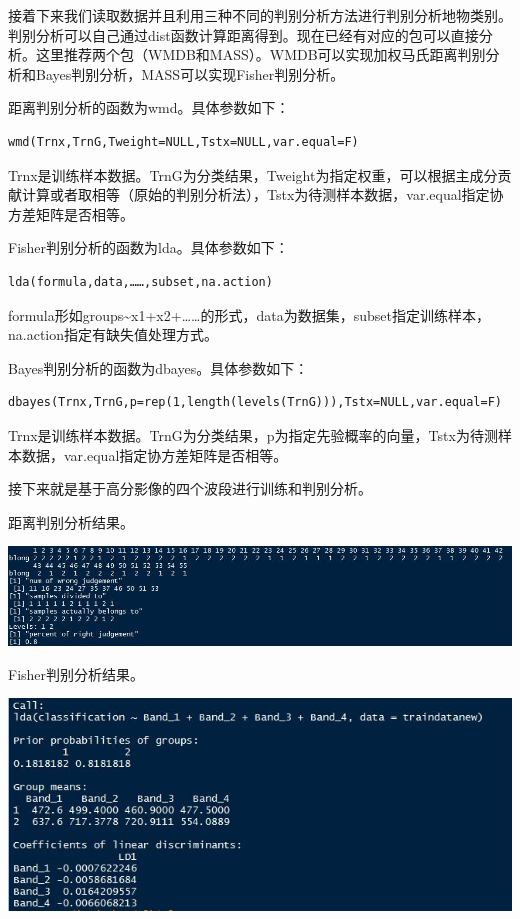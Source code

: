 \documentclass[]{ctexbook}
\begin{document}
接着下来我们读取数据并且利用三种不同的判别分析方法进行判别分析地物类别。判别分析可以自己通过dist函数计算距离得到。现在已经有对应的包可以直接分析。这里推荐两个包（WMDB和MASS）。WMDB可以实现加权马氏距离判别分析和Bayes判别分析，MASS可以实现Fisher判别分析。

距离判别分析的函数为wmd。具体参数如下：

\begin{verbatim}
wmd(Trnx,TrnG,Tweight=NULL,Tstx=NULL,var.equal=F)
\end{verbatim}

Trnx是训练样本数据。TrnG为分类结果，Tweight为指定权重，可以根据主成分贡献计算或者取相等（原始的判别分析法），Tstx为待测样本数据，var.equal指定协方差矩阵是否相等。

Fisher判别分析的函数为lda。具体参数如下：

\begin{verbatim}
lda(formula,data,……,subset,na.action)
\end{verbatim}

formula形如groups\textasciitilde x1+x2+\ldots\ldots 的形式，data为数据集，subset指定训练样本，na.action指定有缺失值处理方式。

Bayes判别分析的函数为dbayes。具体参数如下：

\begin{verbatim}
dbayes(Trnx,TrnG,p=rep(1,length(levels(TrnG))),Tstx=NULL,var.equal=F)
\end{verbatim}

Trnx是训练样本数据。TrnG为分类结果，p为指定先验概率的向量，Tstx为待测样本数据，var.equal指定协方差矩阵是否相等。

接下来就是基于高分影像的四个波段进行训练和判别分析。

距离判别分析结果。

\includegraphics[width=1\linewidth,height=0.2\textheight]{fig/fig29}

Fisher判别分析结果。

\includegraphics[width=1\linewidth,height=0.3\textheight]{fig/fig30}
\end{document}
